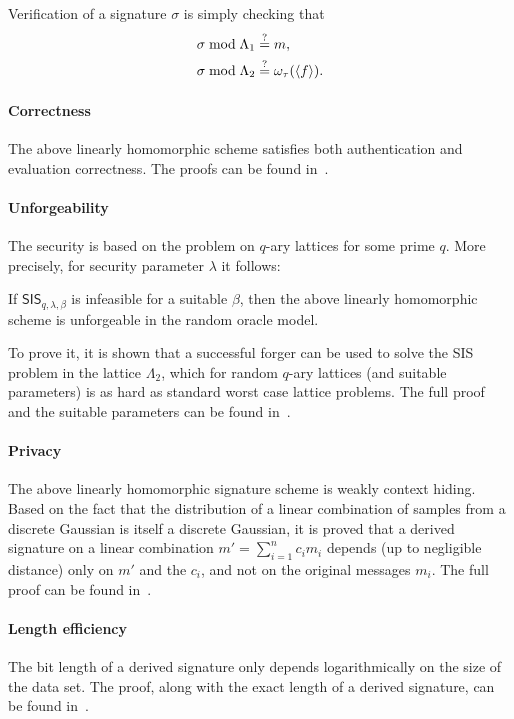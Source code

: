Verification of a signature $\sigma$ is simply checking that
\begin{align}
  \sigma \bmod{\Lambda_1} & \overset{?}{=} m, \nonumber \\
  \sigma \bmod{\Lambda_2} & \overset{?}{=} \omega_\tau(\langle f \rangle).
  \label{eq:bf-lin-vrfy}
\end{align}

\paragraph*{Correctness} The above linearly homomorphic scheme satisfies both
authentication and evaluation correctness. The proofs can be found
in~\cite{boneh:freeman:2011}.

\paragraph*{Unforgeability} The security is based on the  problem on $q$-ary lattices for some prime $q$. More
precisely, for security parameter $\lambda$ it follows:
\begin{theorem}\label{theo:bf-lin-uf}
  If $\mathsf{SIS}_{q, \lambda, \beta}$ is infeasible for a suitable $\beta$,
  then the above linearly homomorphic scheme is unforgeable in the random
  oracle model.
\end{theorem}

To prove it, it is shown that a successful forger can be used to solve the
\textsf{SIS} problem in the lattice $\Lambda_2$, which for random $q$-ary
lattices (and suitable parameters) is as hard as standard worst case lattice
problems. The full proof and the suitable parameters can be found
in~\cite{boneh:freeman:2011}.

\paragraph*{Privacy} The above linearly homomorphic signature scheme is weakly
context hiding. Based on the fact that the distribution of a linear combination
of samples from a discrete Gaussian is itself a discrete Gaussian, it is proved
that a derived signature on a linear combination $m' = \sum_{i = 1}^{n} c_i
m_i$ depends (up to negligible distance) only on $m'$ and the $c_i$, and not on
the original messages $m_i$. The full proof can be found
in~\cite{boneh:freeman:2011}.

\paragraph*{Length efficiency} The bit length of a derived signature only
depends logarithmically on the size of the data set. The proof, along with the
exact length of a derived signature, can be found in~\cite{boneh:freeman:2011}.

